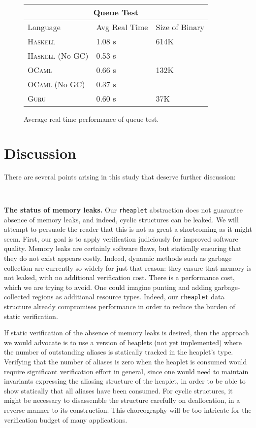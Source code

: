 \documentclass[9pt,natbib]{sigplanconf}
\begin{document}
\begin{figure}
\begin{center}
\begin{tabular}{| l | l | l |}
\hline
\multicolumn{3}{|c|}{Queue Test} \\
\hline
Language & Avg Real Time & Size of Binary\\
\hline
\textsc{Haskell} & 1.08 s & 614K \\
\textsc{Haskell} (No GC) & 0.53 s & \  \\
\textsc{OCaml} & 0.66 s & 132K \\
\textsc{OCaml} (No GC) & 0.37 s &\ \\
\textsc{Guru} & 0.60 s & 37K \\
\hline
\end{tabular}
\end{center}
\caption{Average real time performance of queue test.}
\label{queuestats}
\end{figure}

\section{Discussion}
\label{sec:future}

There are several points arising in this study that deserve further discussion:

\ 

\textbf{The status of memory leaks.} Our \texttt{rheaplet} abstraction
does not guarantee absence of memory leaks, and indeed, cyclic
structures can be leaked.  We will attempt to persuade the reader that
this is not as great a shortcoming as it might seem.  First, our goal
is to apply verification judiciously for improved software quality.
Memory leaks are certainly software flaws, but statically ensuring
that they do not exist appears costly.  Indeed, dynamic methods such
as garbage collection are currently so widely for just that reason:
they ensure that memory is not leaked, with no additional verification
cost.  There is a performance cost, which we are trying to avoid.  One
could imagine punting and adding garbage-collected regions as
additional resource types.  Indeed, our \texttt{rheaplet} data
structure already compromises performance in order to reduce the
burden of static verification.

If static verification of the absence of memory leaks is desired, then
the approach we would advocate is to use a version of heaplets (not
yet implemented) where the number of outstanding aliases is statically
tracked in the heaplet's type.  Verifying that the number of aliases
is zero when the heaplet is consumed would require significant
verification effort in general, since one would need to maintain
invariants expressing the aliasing structure of the heaplet, in order
to be able to show statically that all aliases have been consumed.
For cyclic structures, it might be necessary to disassemble the
structure carefully on deallocation, in a reverse manner to its
construction.  This choreography will be too intricate for the
verification budget of many applications.
\end{document}
